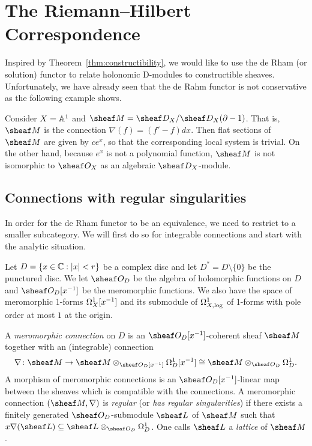 \documentclass[number-in-sections,a4paper]{notes}
\begin{document}
\section{The Riemann--Hilbert Correspondence}

Inspired by Theorem~\ref{thm:constructibility}, we would like to use the de Rham (or solution) functor to relate holonomic D-modules to constructible sheaves.
Unfortunately, we have already seen that the de Rahm functor is not conservative as the following example shows.

\begin{Example}
    Consider $X = \mathbb A^{1}_{}$ and $\sheaf M = \sD_X/\sD_X(\partial - 1)$.
    That is, $\sheaf M$ is the connection $\nabla(f) = (f' - f)dx$.
    Then flat sections of $\sheaf M$ are given by $ce^x$, so that the corresponding local system is trivial.
    On the other hand, because $e^x$ is not a polynomial function, $\sheaf M$ is not isomorphic to $\sO_X$ as an algebraic $\sD_X$-module.
\end{Example}

\subsection{Connections with regular singularities}

In order for the de Rham functor to be an equivalence, we need to restrict to a smaller subcategory.
We will first do so for integrable connections and start with the analytic situation.

Let $D = \{ x \in {\mathbb{C}} : |x| < r \}$ be a complex disc and let $D^* = D \setminus \{0\}$ be the punctured disc.
We let $\sO_D$ be the algebra of holomorphic functions on $D$ and $\sO_D[x^{-1}]$ be the meromorphic functions.
We also have the space of meromorphic 1-forms $\Omega^1_{X}[x^{-1}]$ and its submodule of $\Omega^1_{X,\log}$ of 1-forms with pole order at most $1$ at the origin.

\begin{Definition}
    A \emph{meromorphic connection} on $D$ is an $\sO_D[x^{-1}]$-coherent sheaf  $\sheaf M$ together with an (integrable) connection 
    \[
        \nabla\colon \sheaf M \to \sheaf M \otimes_{\sO_D[x^{-1}]} \ctb D[x^{-1}] \cong \sheaf M \otimes_{\sO_D} \ctb{D}.
    \]
    A morphism of meromorphic connections is an $\sO_D[x^{-1}]$-linear map between the sheaves which is compatible with the connections.
    A meromorphic connection $(\sheaf M, \nabla)$ is \emph{regular} (or \emph{has regular singularities}) if there exists a finitely generated $\sO_D$-submodule $\sheaf L$ of $\sheaf M$ such that $x\nabla(\sheaf L) \subseteq \sheaf L \otimes_{\sO_D} \ctb{D}$.
    One calls $\sheaf L$ a \emph{lattice} of $\sheaf M$.
\end{Definition}
\end{document}
